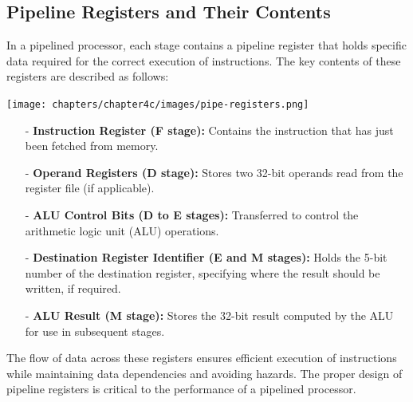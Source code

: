\subsection{Pipeline Registers and Their Contents}
In a pipelined processor, each stage contains a pipeline register that holds specific data required for the correct execution of instructions. The key contents of these registers are described as follows:
\begin{center}
    \texttt{[image: chapters/chapter4c/images/pipe-registers.png]}
\end{center}
\begin{itemize}
    \item[-] \textbf{Instruction Register (F stage):} Contains the instruction that has just been fetched from memory.
    \item[-] \textbf{Operand Registers (D stage):} Stores two 32-bit operands read from the register file (if applicable).
    \item[-] \textbf{ALU Control Bits (D to E stages):} Transferred to control the arithmetic logic unit (ALU) operations.
    \item[-] \textbf{Destination Register Identifier (E and M stages):} Holds the 5-bit number of the destination register, specifying where the result should be written, if required.
    \item[-] \textbf{ALU Result (M stage):} Stores the 32-bit result computed by the ALU for use in subsequent stages.
\end{itemize}

The flow of data across these registers ensures efficient execution of instructions while maintaining data dependencies and avoiding hazards. The proper design of pipeline registers is critical to the performance of a pipelined processor.

